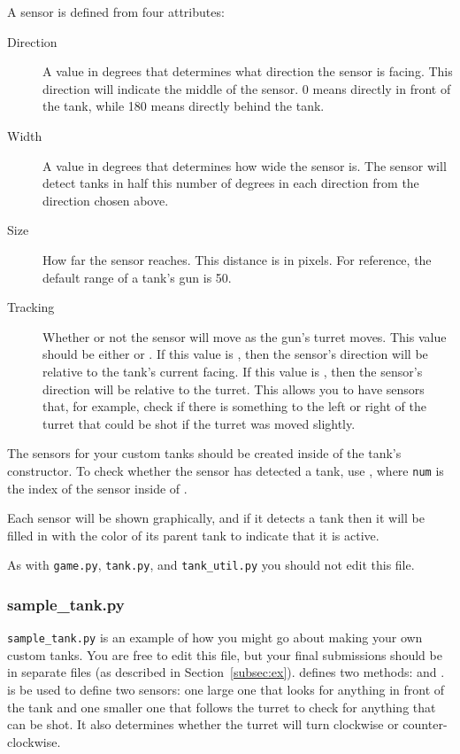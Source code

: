\documentclass[11pt]{cselabheader}
\begin{document}
A sensor is defined from four attributes:
\begin{description}
\item[Direction] A value in degrees that determines what direction the sensor
    is facing. This direction will indicate the middle of the sensor. 0 means
    directly in front of the tank, while 180 means directly behind the tank.
\item[Width] A value in degrees that determines how wide the sensor is. The
    sensor will detect tanks in half this number of degrees in each direction
    from the direction chosen above.
\item[Size] How far the sensor reaches. This distance is in pixels. For
    reference, the default range of a tank's gun is 50.
\item[Tracking] Whether or not the sensor will move as the gun's turret moves.
    This value should be either  or . If
    this value is , then the sensor's direction will be
    relative to the tank's current facing. If this value is ,
    then the sensor's direction will be relative to the turret. This allows you
    to have sensors that, for example, check if there is something to the left
    or right of the turret that could be shot if the turret was moved slightly.
\end{description}

The sensors for your custom tanks should be created inside of the tank's
constructor. To check whether the sensor has detected a tank, use
, where \texttt{num} is the index of the
sensor inside of .

Each sensor will be shown graphically, and if it detects a tank then it will be
filled in with the color of its parent tank to indicate that it is active.

As with \texttt{game.py}, \texttt{tank.py}, and \texttt{tank\_util.py} you should
not edit this file.


\subsubsection{sample\_tank.py}
\texttt{sample\_tank.py} is an example of how you might go about making your own
custom tanks. You are free to edit this file, but your final submissions should
be in separate files (as described in Section~\ref{subsec:ex}).
 defines two methods:  and
.  is be used to
define two sensors: one large one that looks for anything in front of the tank
and one smaller one that follows the turret to check for anything that can be
shot. It also determines whether the turret will turn clockwise or
counter-clockwise.
\end{document}
